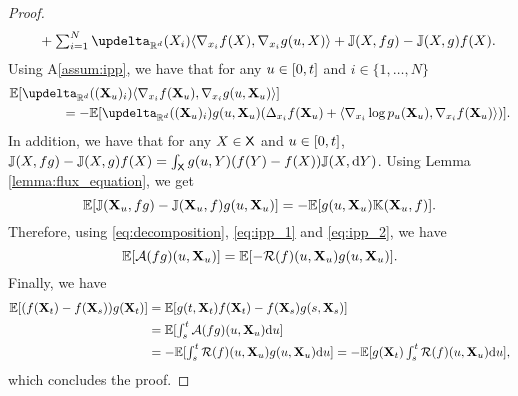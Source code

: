 \begin{proof}
\begin{align}
                      & \qquad \textstyle + \sum_{i=1}^N \updelta_{\rset^d}(X_i) \langle \nabla_{x_i} f(X), \nabla_{x_i} g(u,X) \rangle + \Jbb(X, fg) - \Jbb(X, g)f(X). \label{eq:decomposition}
    \end{align}
    Using A\ref{assum:ipp}, we have that for any $u \in [ 0,t ]$ and $i \in \{1, \dots, N\}$
    \begin{align}
      &\expeLigne{\updelta_{\rset^d}((\bfX_u)_i) \langle \nabla_{x_i} f(\bfX_u), \nabla_{x_i} g(u, \bfX_u) \rangle} \\
      & \qquad \qquad = -  \expeLigne{\updelta_{\rset^d}((\bfX_u)_i) g(u, \bfX_u) (\Delta_{x_i} f(\bfX_u) + \langle \nabla_{x_i} \log p_u(\bfX_u), \nabla_{x_i} f(\bfX_u) \rangle)} . \label{eq:ipp_1}
    \end{align}
    In addition, we have that for any $X \in \mathsf{X}$ and $u \in [ 0,t ]$,
    $\mathbb{J}(X,fg) - \mathbb{J}(X,g)f(X) = \int_{\mathsf{X}} g(u,Y)(f(Y) - f(X)) \mathbb{J}(X, \mathrm{d}
    Y)$. Using Lemma \ref{lemma:flux_equation}, we get
        \begin{equation}
      \mathbb{E}[\mathbb{J}(\mathbf{X}_u, fg) - \mathbb{J}(\mathbf{X}_u,f)g(u,\mathbf{X}_u)] = -\mathbb{E}[g(u,\mathbf{X}_u) \mathbb{K}(\mathbf{X}_u,f)]\textstyle. \label{eq:ipp_2}
    \end{equation}
    Therefore, using \eqref{eq:decomposition}, \eqref{eq:ipp_1} and \eqref{eq:ipp_2}, we have 
    \begin{equation}
      \mathbb{E}[\mathcal{A}(fg)(u, \mathbf{X}_u)] = \mathbb{E}[-\mathcal{R}(f)(u, \mathbf{X}_u)g(u, \mathbf{X}_u)]. 
    \end{equation}
    Finally, we have
    \begin{align}
      \mathbb{E}[(f(\mathbf{X}_t) -f(\mathbf{X}_s))g(\mathbf{X}_t)] &= \mathbb{E}[g(t, \mathbf{X}_t)f(\mathbf{X}_t) -f(\mathbf{X}_s)g(s, \mathbf{X}_s)] \\
                                                  &\textstyle = \mathbb{E}[\int_s^t \mathcal{A}(fg)(u, \mathbf{X}_u) \mathrm{d} u ] \\
      &\textstyle = - \mathbb{E}[\int_s^t \mathcal{R}(f)(u, \mathbf{X}_u)g(u, \mathbf{X}_u) \mathrm{d} u ] = - \mathbb{E}[g(\mathbf{X}_t) \int_s^t \mathcal{R}(f)(u, \mathbf{X}_u) \mathrm{d} u ] , 
    \end{align}
    which concludes the proof.
  \end{proof}















